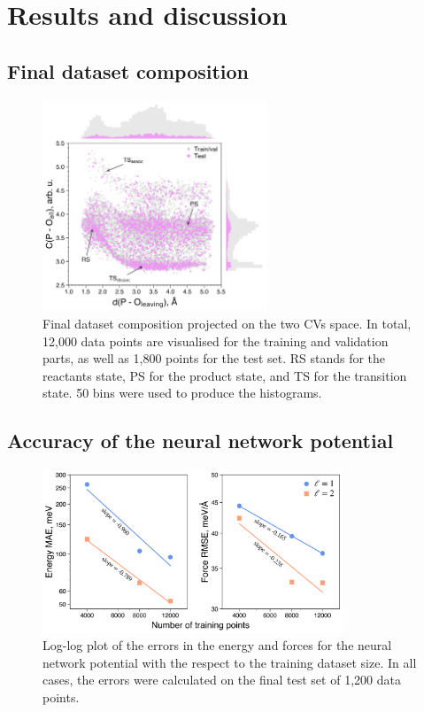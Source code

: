 \chapter{Results and discussion}

\section{Final dataset composition}

\begin{figure}[ht]
    \centering
    \includegraphics[width=0.6\textwidth]{Figures/4_Results/results_final_dataset_with_histograms.png}
    \caption{Final dataset composition projected on the two CVs space. In total, 12,000 data points are visualised for the training and validation parts, as well as 1,800 points for the test set. RS stands for the reactants state, PS for the product state, and TS for the transition state. 50 bins were used to produce the histograms.}
    \label{fig:final_dataset}
\end{figure}


\clearpage
\section{Accuracy of the neural network potential}

\begin{figure}[ht]
    \centering
    \includegraphics[width=0.8\textwidth]{Figures/4_Results/results_nnp_loglog_energy_force.png}
    \caption{Log-log plot of the errors in the energy and forces for the neural network potential with the respect to the training dataset size. In all cases, the errors were calculated on the final test set of 1,200 data points.}
    \label{fig:nnp_log-log}
\end{figure}

